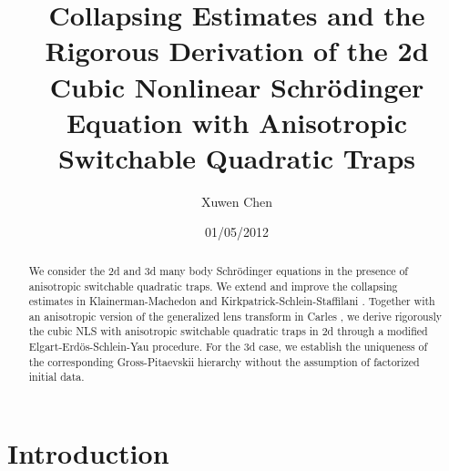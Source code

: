 \documentclass[reqno]{amsart}
\theoremstyle{plain}
\numberwithin{equation}{section}
\begin{document}
\title[2D and 3D Anisotropic Collapsing Estimates]{Collapsing Estimates and
the Rigorous Derivation of the 2d Cubic Nonlinear Schr\"{o}dinger Equation
with Anisotropic Switchable Quadratic Traps}
\author{Xuwen Chen}
\address{Department of Mathematics\\
University of Maryland\\
College Park, MD 20742}
\date{01/05/2012}

\begin{abstract}
We consider the 2d and 3d many body Schr\"{o}dinger equations in the
presence of anisotropic switchable quadratic traps. We extend and improve
the collapsing estimates in Klainerman-Machedon \cite{KlainermanAndMachedon}
and Kirkpatrick-Schlein-Staffilani \cite{Kirpatrick}. Together with an
anisotropic version of the generalized lens transform in Carles \cite{Carles}, we derive rigorously the cubic NLS with anisotropic switchable quadratic
traps in 2d through a modified Elgart-Erd\"{o}s-Schlein-Yau procedure. For
the 3d case, we establish the uniqueness of the corresponding
Gross-Pitaevskii hierarchy without the assumption of factorized initial data.
\end{abstract}

\maketitle

\section{Introduction}
\end{document}
